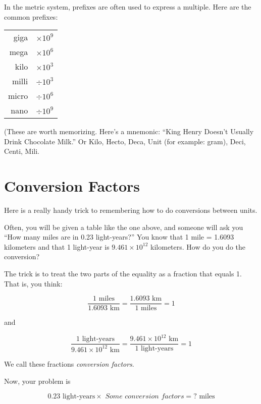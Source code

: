 In the metric system, prefixes are often used to express a multiple. Here are the common prefixes:

\begin{mdframed}[style=important, frametitle={Common Prefixes for Metric Units}]

\begin{tabular}{r | l}
giga  & $\times 10^{9}$\\
mega  & $\times 10^{6}$\\
kilo  & $\times 10^{3}$\\
milli  & $\div 10^{3}$\\
micro  & $\div 10^{6}$\\
nano  & $\div 10^{9}$\\
\end{tabular}

(These are worth memorizing. Here's a mnemonic: ``King Henry Doesn't Usually Drink Chocolate Milk.'' Or Kilo, Hecto, Deca, Unit (for example: gram), Deci, Centi, Mili. 
\end{mdframed}

\section{Conversion Factors}

Here is a really handy trick to remembering how to do conversions
between units.

Often, you will be given a table like the one above, and someone will ask you
``How many miles are in 0.23 light-years?''  You know that 1 mile = 1.6093
kilometers and that 1 light-year is $9.461 \times 10^{12}$ kilometers.
How do you do the conversion?

The trick is to treat the two parts of the equality as a fraction that equals 1.  That is, you think:

$$\frac{1 \text{ miles}}{1.6093 \text{ km}} = \frac{1.6093 \text{ km}}{1 \text{ miles}} = 1$$

and

$$\frac{1 \text{ light-years}}{9.461 \times 10^{12} \text{ km}} = \frac{9.461 \times 10^{12} \text{ km}}{1 \text{ light-years}} = 1$$

We call these fractions \textit{conversion factors}.

Now, your problem is

$$0.23 \text{ light-years} \times \textit{ Some conversion factors} = ? \text{ miles}$$

